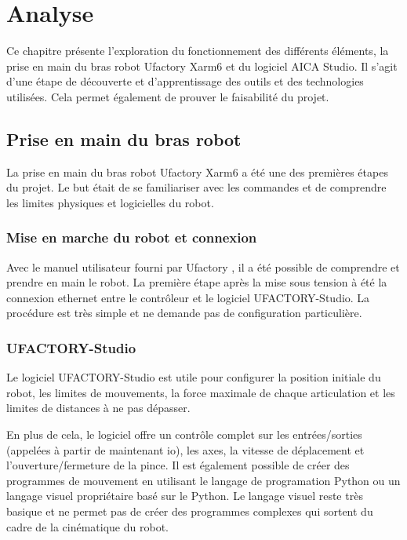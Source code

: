 \chapter{Analyse}
\label{chap:analyse}

Ce chapitre présente l'exploration du fonctionnement des différents éléments, la prise en main du bras robot Ufactory Xarm6 et du logiciel AICA Studio. Il s'agit d'une étape de découverte et d'apprentissage des outils et des technologies utilisées. Cela permet également de prouver le faisabilité du projet.

\section{Prise en main du bras robot}
La prise en main du bras robot Ufactory Xarm6 a été une des premières étapes du projet. Le but était de se familiariser avec les commandes et de comprendre les limites physiques et logicielles du robot.

\subsection{Mise en marche du robot et connexion}
Avec le manuel utilisateur fourni par Ufactory \cite{UserManual}, il a été possible de comprendre et prendre en main le robot. La première étape après la mise sous tension à été la connexion ethernet entre le contrôleur et le logiciel UFACTORY-Studio. La procédure est très simple et ne demande pas de configuration particulière.

\subsection{UFACTORY-Studio}
Le logiciel UFACTORY-Studio est utile pour configurer la position initiale du robot, les limites de mouvements, la force maximale de chaque articulation et les limites de distances à ne pas dépasser.

En plus de cela, le logiciel offre un contrôle complet sur les entrées/sorties (appelées à partir de maintenant \gls{io}), les axes, la vitesse de déplacement et l'ouverture/fermeture de la pince. Il est également possible de créer des programmes de mouvement en utilisant le langage  de programation Python ou un langage visuel propriétaire basé sur le Python. Le langage visuel reste très basique et ne permet pas de créer des programmes complexes qui sortent du cadre de la cinématique du robot.

